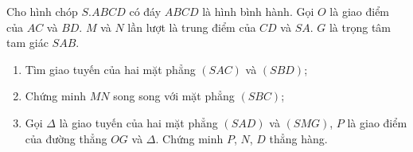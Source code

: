 \begin{bt}
\begin{bt}%
Cho hình chóp $S.ABCD$ có đáy $ABCD$ là hình bình hành. Gọi $O$ là giao điểm của $AC$ và $BD$. $M$ và $N$ lần lượt là trung điểm của $CD$ và $SA$. $G$ là trọng tâm tam giác $SAB$.
\begin{enumerate}
\item Tìm giao tuyến của hai mặt phẳng $(SAC)$ và $(SBD)$;
\item Chứng minh $MN$ song song với mặt phẳng $(SBC)$;
\item Gọi $\Delta$ là giao tuyến của hai mặt phẳng $(SAD)$ và $(SMG)$, $P$ là giao điểm của đường thẳng $OG$ và $\Delta$. Chứng minh $P$, $N$, $D$ thẳng hàng.
\end{enumerate}
\end{bt}
\end{bt}
